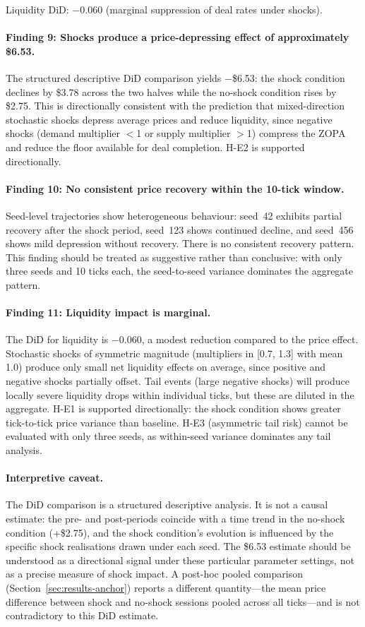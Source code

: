 Liquidity DiD: $-0.060$ (marginal suppression of deal rates under shocks).

\paragraph{Finding 9: Shocks produce a price-depressing effect of approximately \$6.53.}
The structured descriptive DiD comparison yields $-$\$6.53: the shock condition declines by \$3.78 across the two halves while the no-shock condition rises by \$2.75.  This is directionally consistent with the prediction that mixed-direction stochastic shocks depress average prices and reduce liquidity, since negative shocks (demand multiplier $<$1 or supply multiplier $>$1) compress the ZOPA and reduce the floor available for deal completion.  H-E2 is supported directionally.

\paragraph{Finding 10: No consistent price recovery within the 10-tick window.}
Seed-level trajectories show heterogeneous behaviour: seed~42 exhibits partial recovery after the shock period, seed~123 shows continued decline, and seed~456 shows mild depression without recovery.  There is no consistent recovery pattern.  This finding should be treated as suggestive rather than conclusive: with only three seeds and 10 ticks each, the seed-to-seed variance dominates the aggregate pattern.

\paragraph{Finding 11: Liquidity impact is marginal.}
The DiD for liquidity is $-0.060$, a modest reduction compared to the price effect.  Stochastic shocks of symmetric magnitude (multipliers in [0.7, 1.3] with mean 1.0) produce only small net liquidity effects on average, since positive and negative shocks partially offset.  Tail events (large negative shocks) will produce locally severe liquidity drops within individual ticks, but these are diluted in the aggregate.  H-E1 is supported directionally: the shock condition shows greater tick-to-tick price variance than baseline.  H-E3 (asymmetric tail risk) cannot be evaluated with only three seeds, as within-seed variance dominates any tail analysis.

\paragraph{Interpretive caveat.}
The DiD comparison is a structured descriptive analysis.  It is not a causal estimate: the pre- and post-periods coincide with a time trend in the no-shock condition (+\$2.75), and the shock condition's evolution is influenced by the specific shock realisations drawn under each seed.  The \$6.53 estimate should be understood as a directional signal under these particular parameter settings, not as a precise measure of shock impact.  A post-hoc pooled comparison (Section~\ref{sec:results-anchor}) reports a different quantity---the mean price difference between shock and no-shock sessions pooled across all ticks---and is not contradictory to this DiD estimate.

